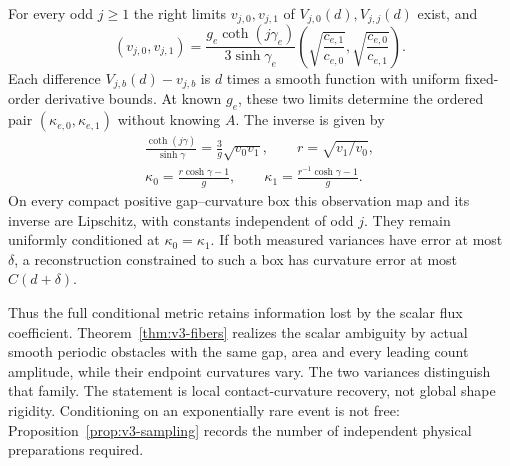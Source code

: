 \begin{theorem}
\label{thm:v3-tomography}
For every odd $j\ge1$ the right limits $v_{j,0},v_{j,1}$ of
$V_{j,0}(d),V_{j,j}(d)$ exist, and
\begin{equation}\label{eq:v3-variance-limits}
 (v_{j,0},v_{j,1})=
 \frac{g_e\coth(j\gamma_e)}{3\sinh\gamma_e}
 \left(\sqrt{\frac{c_{e,1}}{c_{e,0}}},
       \sqrt{\frac{c_{e,0}}{c_{e,1}}}\right).
\end{equation}
Each difference $V_{j,b}(d)-v_{j,b}$ is $d$ times a smooth function
with uniform fixed-order derivative bounds. At known $g_e$, these two
limits determine the ordered pair $(\kappa_{e,0},\kappa_{e,1})$ without
knowing $A$. The inverse is given by
\begin{equation}\label{eq:v3-inverse-map}
 \begin{gathered}
 \frac{\coth(j\gamma)}{\sinh\gamma}
        =\frac3g\sqrt{v_0v_1},\qquad
 r=\sqrt{v_1/v_0},\\
 \kappa_0=\frac{r\cosh\gamma-1}{g},\qquad
 \kappa_1=\frac{r^{-1}\cosh\gamma-1}{g}.
 \end{gathered}
\end{equation}
On every compact positive gap--curvature box this observation map and
its inverse are Lipschitz, with constants independent of odd $j$.
They remain uniformly conditioned at $\kappa_0=\kappa_1$.
If both measured variances have error at most $\delta$, a reconstruction
constrained to such a box has curvature error at most $C(d+\delta)$.
\end{theorem}

Thus the full conditional metric retains information lost by the
scalar flux coefficient. Theorem~\ref{thm:v3-fibers} realizes the
scalar ambiguity by actual smooth periodic obstacles with the same gap,
area and every leading count amplitude, while their endpoint curvatures
vary. The two variances distinguish that family. The statement is local
contact-curvature recovery, not global shape rigidity. Conditioning on
an exponentially rare event is not free: Proposition~\ref{prop:v3-sampling}
records the number of independent physical preparations required.

